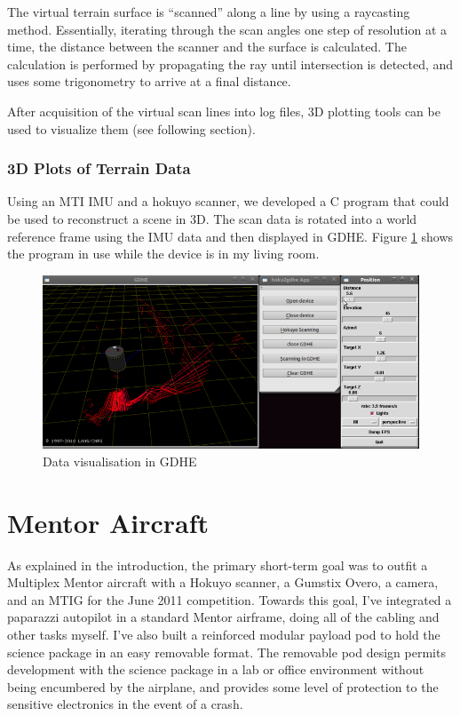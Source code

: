 \documentclass[a4paper,11pt]{report}
\begin{document}
The virtual terrain surface is ``scanned'' along a line by using a raycasting method. Essentially, iterating through the scan angles one step of resolution at a time, the distance between the scanner and the surface is calculated. The calculation is performed by propagating the ray until intersection is detected, and uses some trigonometry to arrive at a final distance.

After acquisition of the virtual scan lines into log files, 3D plotting tools can be used to visualize them (see following section).

\subsubsection{3D Plots of Terrain Data}

Using an MTI IMU and a hokuyo scanner, we developed a C program that could be used to reconstruct a scene in 3D. The scan data is rotated into a world reference frame using the IMU data and then displayed in GDHE. Figure \ref{fig:hoku2gdhe} shows the program in use while the device is in my living room.

\begin{figure}[ht]
 \centering
 \includegraphics[width=18cm]{Hoku2gdhe.png}
 \caption{Data visualisation in GDHE}
 \label{fig:hoku2gdhe}
\end{figure}


\section{Mentor Aircraft}
\label{sec:mentorproject}

As explained in the introduction, the primary short-term goal was to outfit a Multiplex Mentor aircraft with a Hokuyo scanner, a Gumstix Overo, a camera, and an MTIG for the June 2011 competition. Towards this goal, I've integrated a paparazzi autopilot in a standard Mentor airframe, doing all of the cabling and other tasks myself. I've also built a reinforced modular payload pod to hold the science package in an easy removable format. The removable pod design permits development with the science package in a lab or office environment without being encumbered by the airplane, and provides some level of protection to the sensitive electronics in the event of a crash.
\end{document}
